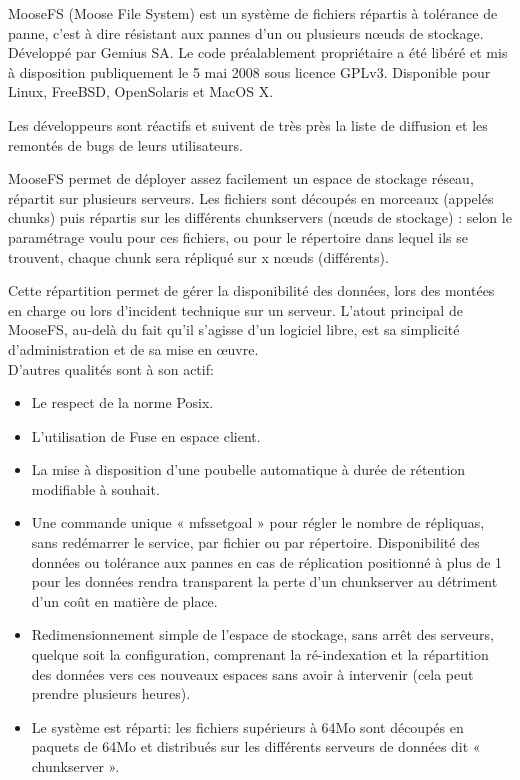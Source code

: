 \documentclass[12pt]{report}
\begin{document}
				
			MooseFS (Moose File System) est un système de fichiers répartis à tolérance de panne,
			c’est à dire résistant aux pannes d’un ou plusieurs nœuds de stockage.
			Développé par Gemius SA. Le code préalablement propriétaire a été libéré et mis à disposition publiquement le 5 mai 2008
			sous licence GPLv3. Disponible pour Linux, FreeBSD, OpenSolaris et MacOS X.

			Les développeurs sont réactifs et suivent de très près la liste de diffusion et les remontés de bugs de leurs utilisateurs.

			MooseFS permet de déployer assez facilement un espace de stockage réseau, répartit sur plusieurs serveurs.
			Les fichiers sont découpés en morceaux (appelés chunks) puis répartis sur les différents chunkservers (nœuds de stockage) :
			selon le paramétrage voulu pour ces fichiers, ou pour le répertoire dans lequel ils se trouvent,
			chaque chunk sera répliqué sur x nœuds (différents).

			Cette répartition permet de gérer la disponibilité des données, lors des montées en charge ou lors d’incident technique
			sur un serveur. L'atout principal de MooseFS, au-delà du fait qu'il s’agisse d’un logiciel libre,
			est sa simplicité d'administration et de sa mise en œuvre.\\

			D'autres qualités sont à son actif:
			\begin{itemize}
                          \item Le respect de la norme Posix.
			  \item L'utilisation de Fuse en espace client.
			  \item La mise à disposition d'une poubelle automatique à durée de rétention modifiable à souhait.
			  \item Une commande unique « mfssetgoal » pour régler le nombre de répliquas, sans redémarrer le service, par fichier ou par répertoire. Disponibilité des données ou tolérance aux pannes en cas de réplication positionné à plus de 1 pour les données rendra transparent la perte d'un chunkserver au détriment d'un coût en matière de place.
			  \item Redimensionnement simple de l'espace de stockage, sans arrêt des serveurs, quelque soit la configuration, comprenant la ré-indexation et la répartition des données vers ces nouveaux espaces sans avoir à intervenir (cela peut prendre plusieurs heures).
			  \item Le système est réparti: les fichiers supérieurs à 64Mo sont découpés en paquets de 64Mo et distribués sur les différents serveurs de données dit « chunkserver ».
                        \end{itemize}
\end{document}
